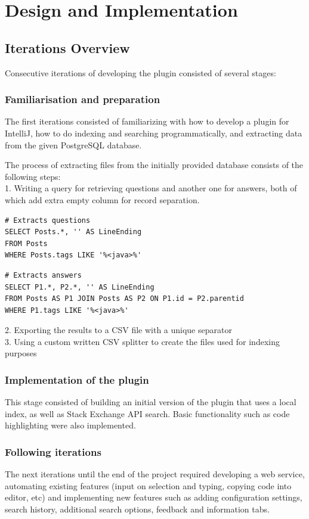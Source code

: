 \documentclass{l4proj}
\begin{document}
\chapter{Design and Implementation}

\section{Iterations Overview}
Consecutive iterations of developing the plugin consisted of several stages:

\subsection{Familiarisation and preparation}
The first iterations consisted of familiarizing with how to develop a plugin for IntelliJ, how to do indexing and searching programmatically, and extracting data from the given PostgreSQL database.

The process of extracting files from the initially provided database consists of the following steps:\\
1. Writing a query for retrieving questions and another one for answers, both of which add extra empty column for record separation.\\

\begin{lstlisting}
# Extracts questions
SELECT Posts.*, '' AS LineEnding
FROM Posts
WHERE Posts.tags LIKE '%<java>%'
\end{lstlisting}

\begin{lstlisting}
# Extracts answers
SELECT P1.*, P2.*, '' AS LineEnding
FROM Posts AS P1 JOIN Posts AS P2 ON P1.id = P2.parentid
WHERE P1.tags LIKE '%<java>%'
\end{lstlisting}

2. Exporting the results to a CSV file with a unique separator\\
3. Using a custom written CSV splitter to create the files used for indexing purposes

\subsection{Implementation of the plugin}
This stage consisted of building an initial version of the plugin that uses a local index, as well as Stack Exchange API search. Basic functionality such as code highlighting were also implemented.

\subsection{Following iterations}
The next iterations until the end of the project required developing a web service, automating existing features (input on selection and typing, copying code into editor, etc) and implementing new features such as adding configuration settings, search history, additional search options, feedback and information tabs.
\end{document}
